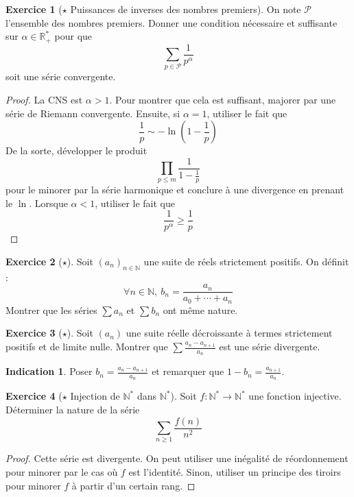 \documentclass[french]{book}
\newcommand{\N}{\mathbb{N}}
\newcommand{\R}{\mathbb{R}}
\newcommand{\st}{^*}
\theoremstyle{definition}
\newtheorem{ex}{Exercice}[chapter]
\theoremstyle{theorem}
\newtheorem*{ind}{Indication}
\theoremstyle{remark}
\begin{document}
\begin{ex}[$\star$ Puissances de inverses des nombres premiers]
	On note $\mathcal{P}$ l'ensemble des nombres premiers. Donner une condition nécessaire et suffisante sur $\alpha\in\R_+\st$ pour que $$\sum_{p\in\mathcal{P}}\frac{1}{p^\alpha}$$ soit une série convergente.
\end{ex}

\begin{proof}
	La CNS est $\alpha >1$. Pour montrer que cela est suffisant, majorer par une série de Riemann convergente. Ensuite, si $\alpha=1$, utiliser le fait que $$\frac{1}{p}\sim -\ln\left(1-\frac{1}{p}\right)$$ De la sorte, développer le produit $$\prod_{p\leqslant m}\frac{1}{1-\frac{1}{p}}$$ pour le minorer par la série harmonique et conclure à une divergence en prenant le $\ln$. Lorsque $\alpha<1$, utiliser le fait que $$\frac{1}{p^\alpha}\geqslant\frac{1}{p}$$
\end{proof}

\begin{ex}[$\star$]
Soit $(a_n)_{n\in\N}$ une suite de réels strictement positifs. On définit : $$\forall n\in\N,\ b_n=\frac{a_n}{a_0+\cdots+a_n}$$ Montrer que les séries $\displaystyle\sum a_n$ et $\displaystyle\sum b_n$ ont même nature.
\end{ex}

\begin{ex}[$\star$]
Soit $(a_n)$ une suite réelle décroissante à termes strictement positifs et de limite nulle. Montrer que $\displaystyle\sum\frac{a_n-a_{n+1}}{a_n}$ est une série divergente.
\end{ex}

\begin{ind}
Poser $b_n=\displaystyle\frac{a_n-a_{n+1}}{a_n}$ et remarquer que $1-b_n=\displaystyle\frac{a_{n+1}}{a_n}$.
\end{ind}

\begin{ex}[$\star$ Injection de $\N\st$ dans $\N\st$]
	Soit $f:\N\st\to\N\st$ une fonction injective. Déterminer la nature de la série $$\sum_{n\geqslant 1}\frac{f(n)}{n^2}$$
\end{ex}

\begin{proof}
	Cette série est divergente. On peut utiliser une inégalité de réordonnement pour minorer par le cas où $f$ est l'identité. Sinon, utiliser un principe des tiroirs pour minorer $f$ à partir d'un certain rang. 
\end{proof}
\end{document}
